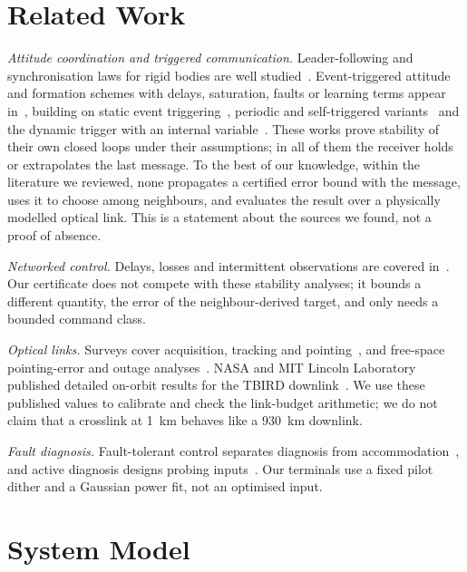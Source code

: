 \documentclass[journal]{IEEEtran}
\begin{document}
\section{Related Work}
\emph{Attitude coordination and triggered communication.} Leader-following and synchronisation laws for rigid bodies are well studied~\cite{ren2007,sarlette2009,abdessameud2009,mayhew2011,dimarogonas2009,cai2014}. Event-triggered attitude and formation schemes with delays, saturation, faults or learning terms appear in~\cite{wang2021,xie2023,xie2024asr,jia2023,xie2024taes}, building on static event triggering~\cite{tabuada2007}, periodic and self-triggered variants~\cite{heemels2013,mazo2010,heemels2012,donkers2012} and the dynamic trigger with an internal variable~\cite{girard2015}. These works prove stability of their own closed loops under their assumptions; in all of them the receiver holds or extrapolates the last message. To the best of our knowledge, within the literature we reviewed, none propagates a certified error bound with the message, uses it to choose among neighbours, and evaluates the result over a physically modelled optical link. This is a statement about the sources we found, not a proof of absence.

\emph{Networked control.} Delays, losses and intermittent observations are covered in~\cite{hespanha2007,zhang2001,sinopoli2004,olfati2007,nowzari2019}. Our certificate does not compete with these stability analyses; it bounds a different quantity, the error of the neighbour-derived target, and only needs a bounded command class.

\emph{Optical links.} Surveys cover acquisition, tracking and pointing~\cite{kaymak2018,kaushal2017,toyoshima2005}, and free-space pointing-error and outage analyses~\cite{farid2007,khalighi2014}. NASA and MIT Lincoln Laboratory published detailed on-orbit results for the TBIRD downlink~\cite{schieler2023,schieler2023icsos}. We use these published values to calibrate and check the link-budget arithmetic; we do not claim that a crosslink at 1~km behaves like a 930~km downlink.

\emph{Fault diagnosis.} Fault-tolerant control separates diagnosis from accommodation~\cite{zhang2008}, and active diagnosis designs probing inputs~\cite{heirung2019,scott2014,raimondo2016}. Our terminals use a fixed pilot dither and a Gaussian power fit, not an optimised input.

\section{System Model}
\end{document}

